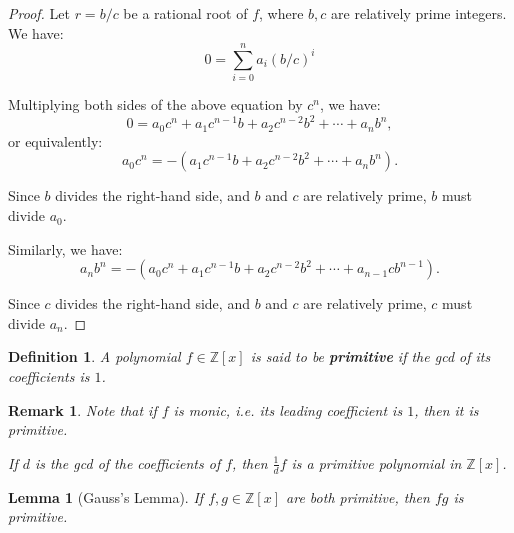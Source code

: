 \documentclass[a4paper,12pt]{report}
\newcounter{statement}
\numberwithin{statement}{chapter}
\newtheorem{defn}[statement]{Definition}
\newtheorem{lemma}[statement]{Lemma}
\newtheorem*{remark}{\bf Remark}
\numberwithin{equation}{chapter}
\numberwithin{section}{chapter}
\numberwithin{subsection}{section}
\begin{document}
\begin{proof}

Let $r = b/c$ be a rational root of $f$, where $b, c$ are relatively prime integers.
We have:
\[
0 = \sum_{i = 0}^n a_i (b/c)^i
\]

Multiplying both sides of the above equation by $c^n$, we have:
\[
0 = a_0c^n + a_1c^{n - 1} b + a_2c^{n - 2}b^2 + \cdots + a_n b^n,
\]
or equivalently:
\[
a_0 c^n = -(a_1c^{n - 1} b + a_2c^{n - 2}b^2 + \cdots + a_n b^n).
\]

Since $b$ divides the right-hand side, and $b$ and $c$ are relatively prime,
$b$ must divide $a_0$.




Similarly, we have:
\[
a_n b^n = - (a_0c^n + a_1c^{n - 1} b + a_2c^{n - 2}b^2 + \cdots + a_{n - 1}cb^{n - 1}).
\]

Since $c$ divides the right-hand side, and $b$ and $c$ are relatively prime, $c$ must divide $a_n$.


\end{proof}




\begin{defn}
A polynomial $f \in \mathbb{Z}[x]$ is said to be  {\bf primitive} 
if the gcd of its coefficients is $1$.
\end{defn}
\begin{remark}

Note that if $f$ is monic, i.e. its leading coefficient is $1$,
then it is primitive.



If $d$ is the gcd of the coefficients of $f$, then $\frac{1}{d}f$ is a primitive polynomial
in $\mathbb{Z}[x]$.
\end{remark}







\begin{lemma}[Gauss's Lemma]


If $f, g \in \mathbb{Z}[x]$ are both primitive, then $fg$ is primitive.
\end{lemma}
\end{document}
